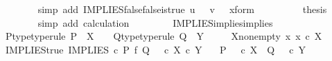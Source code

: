 \begin{isabellebody}
\ \ \ \ \ \ \ \ \isamarkupfalse%
\ {\isacharparenleft}{\kern0pt}simp\ add{\isacharcolon}{\kern0pt}\ IMPLIES{\isacharunderscore}{\kern0pt}false{\isacharunderscore}{\kern0pt}false{\isacharunderscore}{\kern0pt}is{\isacharunderscore}{\kern0pt}true\ {\isacartoucheopen}u\ {\isacharequal}{\kern0pt}\ {\isasymf}{\isacartoucheclose}\ {\isacartoucheopen}v\ {\isacharequal}{\kern0pt}\ {\isasymf}{\isacartoucheclose}\ x{\isacharunderscore}{\kern0pt}form{\isacharparenright}{\kern0pt}\isanewline
\ \ \ \ \ \ \isamarkupfalse%
\ \isamarkupfalse%
\ {\isacharquery}{\kern0pt}thesis\isanewline
\ \ \ \ \ \ \ \ \isamarkupfalse%
\ {\isacharparenleft}{\kern0pt}simp\ add{\isacharcolon}{\kern0pt}\ calculation{\isacharparenright}{\kern0pt}\isanewline
\ \ \ \ \isamarkupfalse%
\isanewline
\ \ \isamarkupfalse%
\isanewline
{}\isamarkupfalse%
%
\endisatagproof
{\isafoldproof}%
%
\isadelimproof
\isanewline
%
\endisadelimproof
\isanewline
{}\isamarkupfalse%
\ IMPLIES{\isacharunderscore}{\kern0pt}implies{\isacharunderscore}{\kern0pt}implies{\isacharcolon}{\kern0pt}\isanewline
\ \ \ P{\isacharunderscore}{\kern0pt}type{\isacharbrackleft}{\kern0pt}type{\isacharunderscore}{\kern0pt}rule{\isacharbrackright}{\kern0pt}{\isacharcolon}{\kern0pt}\ {\isachardoublequoteopen}P\ {\isacharcolon}{\kern0pt}\ X\ {\isasymrightarrow}\ {\isasymOmega}{\isachardoublequoteclose}\ \ Q{\isacharunderscore}{\kern0pt}type{\isacharbrackleft}{\kern0pt}type{\isacharunderscore}{\kern0pt}rule{\isacharbrackright}{\kern0pt}{\isacharcolon}{\kern0pt}\ {\isachardoublequoteopen}Q\ {\isacharcolon}{\kern0pt}\ Y\ {\isasymrightarrow}\ {\isasymOmega}{\isachardoublequoteclose}\isanewline
\ \ \ X{\isacharunderscore}{\kern0pt}nonempty{\isacharcolon}{\kern0pt}\ {\isachardoublequoteopen}{\isasymexists}x{\isachardot}{\kern0pt}\ x\ {\isasymin}\isactrlsub c\ X{\isachardoublequoteclose}\isanewline
\ \ \ IMPLIES{\isacharunderscore}{\kern0pt}true{\isacharcolon}{\kern0pt}\ {\isachardoublequoteopen}IMPLIES\ {\isasymcirc}\isactrlsub c\ {\isacharparenleft}{\kern0pt}P\ {\isasymtimes}\isactrlsub f\ Q{\isacharparenright}{\kern0pt}\ {\isacharequal}{\kern0pt}\ {\isasymt}\ {\isasymcirc}\isactrlsub c\ {\isasymbeta}\isactrlbsub X\ {\isasymtimes}\isactrlsub c\ Y\isactrlesub {\isachardoublequoteclose}\isanewline
\ \ \ {\isachardoublequoteopen}P\ {\isacharequal}{\kern0pt}\ {\isasymt}\ {\isasymcirc}\isactrlsub c\ {\isasymbeta}\isactrlbsub X\isactrlesub \ {\isasymLongrightarrow}\ Q\ {\isacharequal}{\kern0pt}\ {\isasymt}\ {\isasymcirc}\isactrlsub c\ {\isasymbeta}\isactrlbsub Y\isactrlesub {\isachardoublequoteclose}\isanewline

\end{isabellebody}
